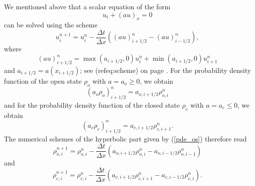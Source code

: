 \bigskip 
We mentioned above that a scalar equation of the form
\begin{equation}
u_{t}+\left(  au\right)  _{x}=0
\end{equation}
can be solved using the scheme 
\begin{equation}
u_{i}^{n+1}=u_{i}^{n}-\frac{\Delta t}{\Delta x}\left(  \left(  au\right)
_{i+1/2}^{n}-\left(  au\right)  _{i-1/2}^{n}\right)  ,\label{eq:scheme_os}
\end{equation}
where
\begin{equation}
\left(  au\right)  _{i+1/2}^{n}=\max(a_{i+1/2},0)u_{i}^{n}+\min(a_{i+1/2}
,0)u_{i+1}^{n} \label{eq:flux_os}
\end{equation}
and $a_{i+1/2}=a(x_{i+1/2})$;
see (ref{eq:scheme}) on page \pageref{npdf}. For the probability
density function of the open state $\rho_{o}$ with $a=a_{o}\geq0$, we obtain
\begin{equation}
\left(  a_{o}\rho_{o}\right)  _{i+1/2}^{n}=a_{o,i+1/2}\rho_{o,i}^{n}
\end{equation}
and for the probability density function of the closed state $\rho_{c}$ with
$a=a_{c}\leq0$, we obtain
\begin{equation}
\left(  a_{c}\rho_{c}\right)  _{i+1/2}^{n}=a_{c,i+1/2}\rho_{c,i+1}^{n}.
\end{equation}
The numerical schemes of the hyperbolic part given by (\ref{pde_os}) therefore read
\begin{equation}
\rho_{o,i}^{n+1}=\rho_{o,i}^{n}-\frac{\Delta t}{\Delta x}\left(
a_{o,i+1/2}\rho_{o,i}^{n}-a_{o,i-1/2}\rho_{o,i-1}^{n}\right)  
\end{equation}
and
\begin{equation}
\rho_{c,i}^{n+1}=\rho_{c,i}^{n}-\frac{\Delta t}{\Delta x}\left(
a_{c,i+1/2}\rho_{c,i+1}^{n}-a_{c,i-1/2}\rho_{c,i}^{n}\right)  .
\end{equation}

